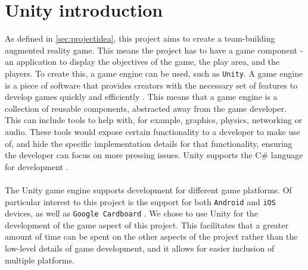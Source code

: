 \section{Unity introduction}\label{sec:unity-intro}
As defined in \autoref{sec:projectidea}, this project aims to create a team-building augmented reality game.
This means the project has to have a game component - an application to display the objectives of the game, the play area, and the players.
To create this, a game engine can be used, such as \texttt{Unity}.
A game engine is a piece of software that provides creators with the necessary set of features to develop games quickly and efficiently \cite{gameengine}.
This means that a game engine is a collection of reusable components, abstracted away from the game developer.
This can include tools to help with, for example, graphics, physics, networking or audio.
These tools would expose certain functionality to a developer to make use of, and hide the specific implementation details for that functionality, ensuring the developer can focus on more pressing issues.
Unity supports the C\# language for development \cite{unitylanguage}.
\\\\
The Unity game engine supports development for different game platforms.
Of particular interest to this project is the support for both \texttt{Android} and \texttt{iOS} devices, as well as \texttt{Google Cardboard} \cite{unityplatforms}.
We chose to use Unity for the development of the game aspect of this project.
This facilitates that a greater amount of time can be spent on the other aspects of the project rather than the low-level details of game development, and it allows for easier inclusion of multiple platforms.
